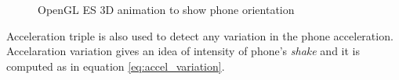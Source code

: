 \documentclass[conference]{IEEEtran}
\begin{document}
\begin{figure}[!ht]
\begin{center}
\caption{OpenGL ES 3D animation to show phone orientation}
\label{img:opengl}
\end{center}
\end{figure}


Acceleration triple is also used to detect any variation in the phone acceleration. Accelaration variation gives an idea of intensity of phone's \textit{shake} and it is computed as in equation \ref{eq:accel_variation}.\\
\end{document}
